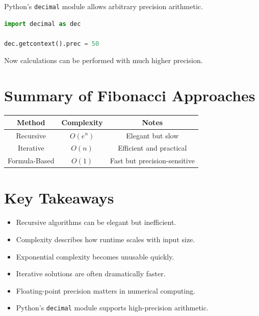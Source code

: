\documentclass[11pt]{article}
\begin{document}
Python's \texttt{decimal} module allows arbitrary precision arithmetic.

\begin{lstlisting}[language=Python]
import decimal as dec

dec.getcontext().prec = 50
\end{lstlisting}

Now calculations can be performed with much higher precision.

\section{Summary of Fibonacci Approaches}

\begin{center}
\begin{tabular}{ccc}
\toprule
Method & Complexity & Notes \\
\midrule
Recursive & $O(e^n)$ & Elegant but slow \\
Iterative & $O(n)$ & Efficient and practical \\
Formula-Based & $O(1)$ & Fast but precision-sensitive \\
\bottomrule
\end{tabular}
\end{center}

\section{Key Takeaways}

\begin{itemize}
    \item Recursive algorithms can be elegant but inefficient.
    \item Complexity describes how runtime scales with input size.
    \item Exponential complexity becomes unusable quickly.
    \item Iterative solutions are often dramatically faster.
    \item Floating-point precision matters in numerical computing.
    \item Python's \texttt{decimal} module supports high-precision arithmetic.
\end{itemize}
\end{document}
